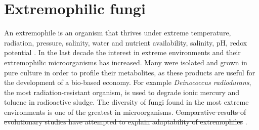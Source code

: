 \documentclass[12pt, a4paper]{report}
\begin{document}
\section{Extremophilic fungi}
An extremophile is an organism that thrives under extreme temperature, 
radiation, pressure, salinity, water and nutrient availability, salinity, pH, redox 
potential \cite{Rothschild2001}.  
In the last decade the interest in extreme environments and their extremophilic 
microorganisms has increased. Many were isolated and grown in pure culture in order to  
profile their metabolites, as these products are useful for the development of a bio-based 
economy. For example \textit{Deinococcus radiodurans}, the most radiation-resistant organism, is used to degrade ionic mercury and toluene in radioactive sludge. The diversity of fungi found in the most extreme environments is one of the greatest in microorganisms. \sout{Comparative results of 
evolutionary studies have attempted to explain adaptability of extremophiles} 
\cite{Gostincar2010}.  
\end{document}
